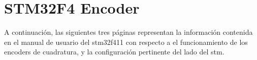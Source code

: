 \chapter{STM32F4 Encoder}

A continuación, las siguientes tres páginas representan la información contenida en el manual de usuario del stm32f411 con respecto a el funcionamiento de los encoders de cuadratura, y la configuración pertinente del lado del stm.


